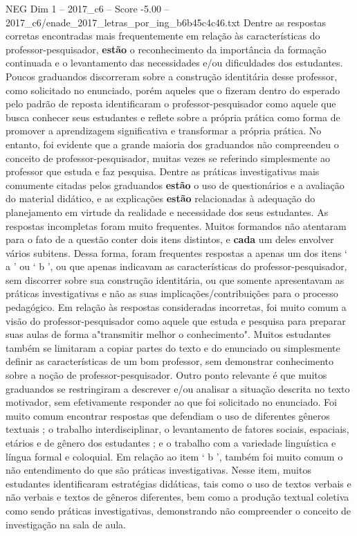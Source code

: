 \begin{textsample}{NEG Dim 1 – 2017\_c6 – Score -5.00 – 2017\_c6/enade\_2017\_letras\_por\_ing\_b6b45c4c46.txt}
Dentre as respostas corretas encontradas mais frequentemente em relação às características do professor-pesquisador, \textbf{estão} o reconhecimento da importância da formação continuada e o levantamento das necessidades e/ou dificuldades dos estudantes.
Poucos graduandos discorreram sobre a construção identitária desse professor, como solicitado no enunciado, porém aqueles que o fizeram dentro do esperado pelo padrão de reposta identificaram o professor-pesquisador como aquele que busca conhecer seus estudantes e reflete sobre a própria prática como forma de promover a aprendizagem significativa e transformar a própria prática.
No entanto, foi evidente que a grande maioria dos graduandos não compreendeu o conceito de professor-pesquisador, muitas vezes se referindo simplesmente ao professor que estuda e faz pesquisa.
Dentre as práticas investigativas mais comumente citadas pelos graduandos \textbf{estão} o uso de questionários e a avaliação do material didático, e as explicações \textbf{estão} relacionadas à adequação do planejamento em virtude da realidade e necessidade dos seus estudantes.
As respostas incompletas foram muito frequentes.
Muitos formandos não atentaram para o fato de a questão conter dois itens distintos, e \textbf{cada} um deles envolver vários subitens.
Dessa forma, foram frequentes respostas a apenas um dos itens ‘ a ’ ou ‘ b ’, ou que apenas indicavam as características do professor-pesquisador, sem discorrer sobre sua construção identitária, ou que somente apresentavam as práticas investigativas e não as suas implicações/contribuições para o processo pedagógico.
Em relação às respostas consideradas incorretas, foi muito comum a visão do professor-pesquisador como aquele que estuda e pesquisa para preparar suas aulas de forma a"transmitir melhor o conhecimento".
Muitos estudantes também se limitaram a copiar partes do texto e do enunciado ou simplesmente definir as características de um bom professor, sem demonstrar conhecimento sobre a noção de professor-pesquisador.
Outro ponto relevante é que muitos graduandos se restringiram a descrever e/ou analisar a situação descrita no texto motivador, sem efetivamente responder ao que foi solicitado no enunciado.
Foi muito comum encontrar respostas que defendiam o uso de diferentes gêneros textuais ; o trabalho interdisciplinar, o levantamento de fatores sociais, espaciais, etários e de gênero dos estudantes ; e o trabalho com a variedade linguística e língua formal e coloquial.
Em relação ao item ‘ b ’, também foi muito comum o não entendimento do que são práticas investigativas.
Nesse item, muitos estudantes identificaram estratégias didáticas, tais como o uso de textos verbais e não verbais e textos de gêneros diferentes, bem como a produção textual coletiva como sendo práticas investigativas, demonstrando não compreender o conceito de investigação na sala de aula.

\end{textsample}
